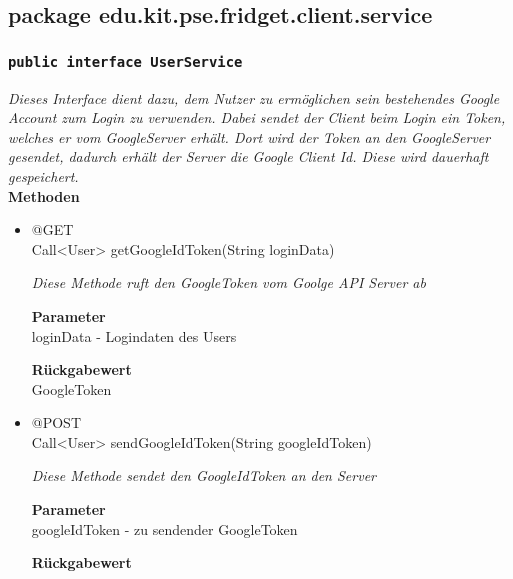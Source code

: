 




\subsection{package edu.kit.pse.fridget.client.service}
	
	\subsubsection{\texttt{public interface UserService}}
\textit{Dieses Interface dient dazu, dem Nutzer zu ermöglichen sein bestehendes Google Account zum Login zu verwenden. Dabei sendet der Client beim Login ein Token, welches er vom GoogleServer erhält. Dort wird der Token an den GoogleServer gesendet, dadurch erhält der Server die Google Client Id. Diese wird dauerhaft gespeichert.}\\

	\textbf{Methoden} \\
		\begin{itemize}
		\item{@GET\\ Call<User> getGoogleIdToken(String loginData)}

		\textit{Diese Methode ruft den GoogleToken vom Goolge API Server ab}

		\textbf{Parameter} \\
	loginData - Logindaten des Users

		\textbf{Rückgabewert} \\
	GoogleToken

      \item{@POST\\ Call<User> sendGoogleIdToken(String googleIdToken)}

		\textit{Diese Methode sendet den GoogleIdToken an den Server}

		\textbf{Parameter} \\
		googleIdToken - zu sendender GoogleToken

		\textbf{Rückgabewert} \\
	

	 \end{itemize}

